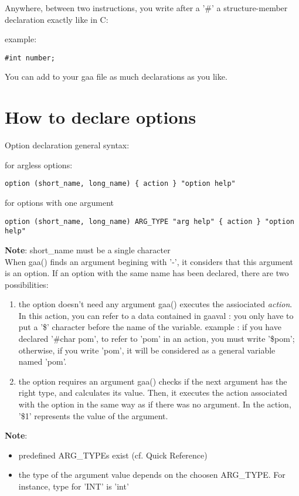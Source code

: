 Anywhere, between two instructions, you write after a '\#' a structure-member
declaration exactly like in C: 
\par
example: 
\begin{verbatim}
#int number;
\end{verbatim}

You can add to your gaa file as much declarations as you like.

\section{ How to declare options}
Option declaration general syntax:
\par
for argless options:

\begin{verbatim}
option (short_name, long_name) { action } "option help"
\end{verbatim}

\par
for options with one argument

\begin{verbatim}
option (short_name, long_name) ARG_TYPE "arg help" { action } "option help"
\end{verbatim}

{\bf Note}: short\_name must be a single character \\
When gaa() finds an argument begining with '-', it considers that this
argument is an option. If an option with the same name has been declared,
there are two possibilities:

\begin{enumerate}
\item the option doesn't need any argument
 gaa() executes the assiociated {\it action}. In
this action, you can refer to a data contained in gaaval : you only have
to put a '\$' character before the name of the variable.
example : if you have declared '\#char pom', to refer
to 'pom' in an action, you must write '\$pom'; otherwise, if you write 'pom',
it will be considered as a general variable named 'pom'.
\item the option requires an argument
gaa() checks if the next argument has the right
type, and calculates its value. Then, it executes the action associated
with the option in the same way as if there was no argument. In the action,
'\$1' represents the value of the argument.

\end{enumerate}
{\bf Note}:
\begin{itemize}
\item predefined ARG\_TYPEs exist (cf. Quick Reference)

\item the type of the argument value depends on the choosen ARG\_TYPE. For instance,
type for 'INT' is 'int'
\end{itemize}

